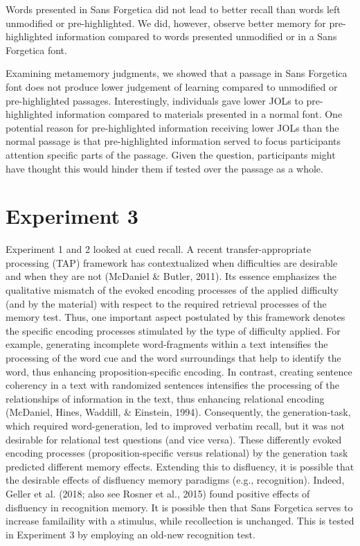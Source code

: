 \documentclass[english,doc]{apa6}
\begin{document}
Words presented in Sans Forgetica did not lead to better recall than words left unmodified or pre-highlighted. We did, however, observe better memory for pre-highlighted information compared to words presented unmodified or in a Sans Forgetica font.

Examining metamemory judgments, we showed that a passage in Sans Forgetica font does not produce lower judgement of learning compared to unmodified or pre-highlighted passages. Interestingly, individuals gave lower JOLs to pre-highlighted information compared to materials presented in a normal font. One potential reason for pre-highlighted information receiving lower JOLs than the normal passage is that pre-highlighted information served to focus participants attention specific parts of the passage. Given the question, participants might have thought this would hinder them if tested over the passage as a whole.

\hypertarget{experiment-3}{%
\section{Experiment 3}\label{experiment-3}}

Experiment 1 and 2 looked at cued recall. A recent transfer-appropriate processing (TAP) framework has contextualized when difficulties are desirable and when they are not (McDaniel \& Butler, 2011). Its essence emphasizes the qualitative mismatch of the evoked encoding processes of the applied difficulty (and by the material) with respect to the required retrieval processes of the memory test. Thus, one important aspect postulated by this framework denotes the specific encoding processes stimulated by the type of difficulty applied. For example, generating incomplete word-fragments within a text intensifies the processing of the word cue and the word surroundings that help to identify the word, thus enhancing proposition-specific encoding. In contrast, creating sentence coherency in a text with randomized sentences intensifies the processing of the relationships of information in the text, thus enhancing relational encoding (McDaniel, Hines, Waddill, \& Einstein, 1994). Consequently, the generation-task, which required word-generation, led to improved verbatim recall, but it was not desirable for relational test questions (and vice versa). These differently evoked encoding processes (proposition-specific versus relational) by the generation task predicted different memory effects. Extending this to disfluency, it is possible that the desirable effects of disfluency memory paradigms (e.g., recognition). Indeed, Geller et al. (2018; also see Rosner et al., 2015) found positive effects of disfluency in recognition memory. It is possible then that Sans Forgetica serves to increase familaility with a stimulus, while recollection is unchanged. This is tested in Experiment 3 by employing an old-new recognition test.
\end{document}
